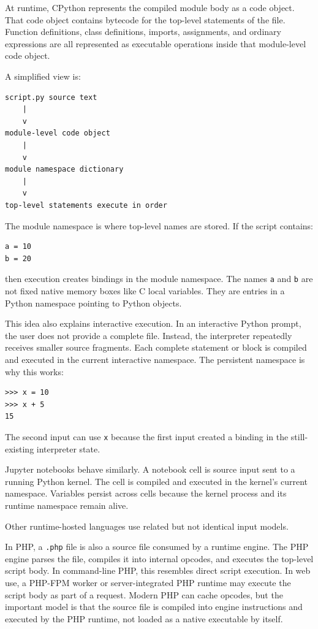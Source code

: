 \documentclass[a4paper,twoside]{report}
\begin{document}
At runtime, CPython represents the compiled module body as a code object. That code object contains bytecode for the top-level statements of the file. Function definitions, class definitions, imports, assignments, and ordinary expressions are all represented as executable operations inside that module-level code object.

A simplified view is:

\begin{verbatim}
script.py source text
    |
    v
module-level code object
    |
    v
module namespace dictionary
    |
    v
top-level statements execute in order
\end{verbatim}

The module namespace is where top-level names are stored. If the script contains:

\begin{verbatim}
a = 10
b = 20
\end{verbatim}

then execution creates bindings in the module namespace. The names \texttt{a} and \texttt{b} are not fixed native memory boxes like C local variables. They are entries in a Python namespace pointing to Python objects.

This idea also explains interactive execution. In an interactive Python prompt, the user does not provide a complete file. Instead, the interpreter repeatedly receives smaller source fragments. Each complete statement or block is compiled and executed in the current interactive namespace. The persistent namespace is why this works:

\begin{verbatim}
>>> x = 10
>>> x + 5
15
\end{verbatim}

The second input can use \texttt{x} because the first input created a binding in the still-existing interpreter state.

Jupyter notebooks behave similarly. A notebook cell is source input sent to a running Python kernel. The cell is compiled and executed in the kernel's current namespace. Variables persist across cells because the kernel process and its runtime namespace remain alive.

Other runtime-hosted languages use related but not identical input models.

In PHP, a \texttt{.php} file is also a source file consumed by a runtime engine. The PHP engine parses the file, compiles it into internal opcodes, and executes the top-level script body. In command-line PHP, this resembles direct script execution. In web use, a PHP-FPM worker or server-integrated PHP runtime may execute the script body as part of a request. Modern PHP can cache opcodes, but the important model is that the source file is compiled into engine instructions and executed by the PHP runtime, not loaded as a native executable by itself.
\end{document}
